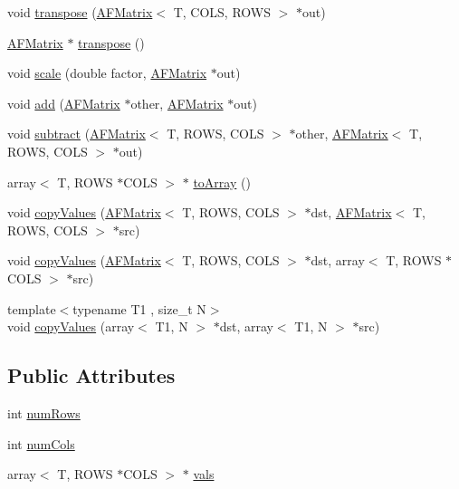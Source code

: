 \begin{DoxyCompactItemize}
\item 
void \hyperlink{class_a_f_matrix_ae087fb4a064d256eac51513863b06fa2}{transpose} (\hyperlink{class_a_f_matrix}{A\+F\+Matrix}$<$ T, C\+O\+LS, R\+O\+WS $>$ $\ast$out)
\item 
\hyperlink{class_a_f_matrix}{A\+F\+Matrix} $\ast$ \hyperlink{class_a_f_matrix_a5f20b3ee2b16cbb9b9b39215a81d3aa1}{transpose} ()
\item 
void \hyperlink{class_a_f_matrix_a905b58769fceaf03972f7ea179ea3934}{scale} (double factor, \hyperlink{class_a_f_matrix}{A\+F\+Matrix} $\ast$out)
\item 
void \hyperlink{class_a_f_matrix_aad31e9f92bfa3323313b153fddcd676b}{add} (\hyperlink{class_a_f_matrix}{A\+F\+Matrix} $\ast$other, \hyperlink{class_a_f_matrix}{A\+F\+Matrix} $\ast$out)
\item 
void \hyperlink{class_a_f_matrix_a85ffed84dc6b1acb24a2c73e54511dff}{subtract} (\hyperlink{class_a_f_matrix}{A\+F\+Matrix}$<$ T, R\+O\+WS, C\+O\+LS $>$ $\ast$other, \hyperlink{class_a_f_matrix}{A\+F\+Matrix}$<$ T, R\+O\+WS, C\+O\+LS $>$ $\ast$out)
\item 
array$<$ T, R\+O\+WS $\ast$C\+O\+LS $>$ $\ast$ \hyperlink{class_a_f_matrix_a7e3659073ff6da5ffd02de48156decf5}{to\+Array} ()
\item 
void \hyperlink{class_a_f_matrix_ad44dc733a8bcf412437d0beebd458176}{copy\+Values} (\hyperlink{class_a_f_matrix}{A\+F\+Matrix}$<$ T, R\+O\+WS, C\+O\+LS $>$ $\ast$dst, \hyperlink{class_a_f_matrix}{A\+F\+Matrix}$<$ T, R\+O\+WS, C\+O\+LS $>$ $\ast$src)
\item 
void \hyperlink{class_a_f_matrix_ac655b95d85d38a72621381b5cf89df83}{copy\+Values} (\hyperlink{class_a_f_matrix}{A\+F\+Matrix}$<$ T, R\+O\+WS, C\+O\+LS $>$ $\ast$dst, array$<$ T, R\+O\+WS $\ast$C\+O\+LS $>$ $\ast$src)
\item 
{\footnotesize template$<$typename T1 , size\+\_\+t N$>$ }\\void \hyperlink{class_a_f_matrix_ac8930dd6d5ea5167fed5c768b96635f7}{copy\+Values} (array$<$ T1, N $>$ $\ast$dst, array$<$ T1, N $>$ $\ast$src)
\end{DoxyCompactItemize}
\subsection*{Public Attributes}
\begin{DoxyCompactItemize}
\item 
int \hyperlink{class_a_f_matrix_a8e18ed7d084bfa8b040f7abd89918b42}{num\+Rows}
\item 
int \hyperlink{class_a_f_matrix_aed28746540fcca94d5d1448b098b4ecc}{num\+Cols}
\item 
array$<$ T, R\+O\+WS $\ast$C\+O\+LS $>$ $\ast$ \hyperlink{class_a_f_matrix_abca47cc50d551c1e8d79559773729e87}{vals}
\end{DoxyCompactItemize}


